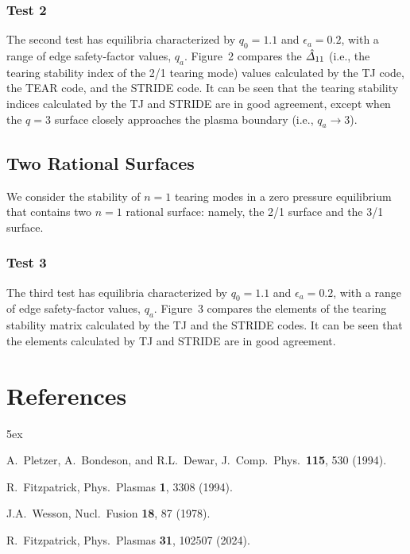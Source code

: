 \documentclass[12pt,prb,aps,notitlepage]{revtex4-1}
\begin{document}
\subsubsection{Test 2}
The second test has equilibria characterized by $q_0=1.1$ and $\epsilon_a=0.2$, with a range of edge safety-factor values, $q_a$. 
Figure~2 compares the $\hat{\mit\Delta}_{11}$ (i.e.,
the tearing stability index of the 2/1 tearing mode) values calculated by the TJ code, the TEAR code, and
the STRIDE code. It can be seen that the tearing stability indices calculated by the TJ and STRIDE are in good agreement, except when the $q=3$ surface closely approaches the
plasma boundary (i.e., $q_a\rightarrow 3$). 
 
 \subsection{Two Rational Surfaces}
 We consider the stability of $n=1$ tearing modes 
in a zero pressure equilibrium  that  contains two $n=1$ rational surface: namely, the 2/1 surface and the 3/1 surface. 

\subsubsection{Test 3}
The third test has equilibria characterized by $q_0=1.1$ and $\epsilon_a=0.2$, with a range of edge safety-factor values, $q_a$. 
Figure~3 compares the elements of the tearing stability matrix calculated by the TJ and the STRIDE codes. It can be seen that the elements calculated by
TJ and STRIDE are in good agreement. 

\section*{References}
\begin{thebibliography}{99}\baselineskip 5ex

 A.~Pletzer, A.~Bondeson, and R.L.~Dewar, J.\ Comp.\ Phys.\ {\bf 115}, 530 (1994).

 R.~Fitzpatrick, Phys.\ Plasmas {\bf 1}, 3308 (1994). 

 J.A.~Wesson, Nucl.\ Fusion {\bf 18},  87 (1978). 

 R.~Fitzpatrick, Phys.\ Plasmas {\bf 31}, 102507 (2024).

\end{thebibliography}
\end{document}
